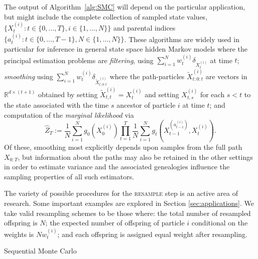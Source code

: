 \documentclass{article} %
\theoremstyle{definition}
\newcommand{\1}[1]{\mathbbm{1}_{\{#1\}}}
\begin{document}
The output of Algorithm~\ref{alg:SMC} will depend on the particular application, but might include the complete collection of sampled state values, $\{X_t^{(i)}: t\in\{0,\ldots,T\}, i \in\{1,\ldots,N\}\}$ and parental indices $\{a_t^{(i)}:t\in\{0,\ldots,T-1\},N\in\{1,\ldots,N\}\}$. These algorithms are widely used in particular for inference in general state space hidden Markov models where the principal estimation problems are \textit{filtering}, using
$\sum_{i=1}^N w_t^{(i)} \delta_{X_t^{(i)}}$ at time $t$; \textit{smoothing} using
  $\sum_{i=1}^N w_t^{(i)} \delta_{\tilde{X}_{t,0:t}^{(i)}}$
  where the path-particles $\tilde{X}_{t:0:t}^{(i)}$ are vectors in $\mathbb{R}^{d\times(t+1)}$ obtained by setting $\tilde{X}_{t,t}^{(i)} = X_{t}^{(i)}$ and setting $X_{t,s}^{(i)}$ for each $s < t$ to the state associated with the time $s$ ancestor of particle $i$ at time $t$;
  and computation of the \emph{marginal likelihood} via $$\hat{Z}_T := \frac{1}{N} \sum_{i=1}^N g_0(X_0^{(i)}) \prod_{t=1}^T \frac{1}{N} \sum_{i=1}^N g_t(X_{t-1}^{(a_{t-1}^{(i)})}, X_t^{(i)}).$$ Of these, smoothing most explicitly depends upon samples from the full path $X_{0:T}$, but information about the paths may also be retained in the other settings in order to estimate variance \cite{lee2018, olsson2019} and the associated genealogies influence the sampling properties of all such estimators.

The variety of possible procedures for the \textsc{resample} step is an active area of research. Some important examples are explored in Section \ref{sec:applications}.
We  take valid resampling schemes to be those where: the total number of resampled offspring is $N$; the expected number of offspring of particle $i$ conditional on the weights is $N w_t^{(i)}$; and each offspring is assigned equal weight after resampling.

\vspace{10pt}
\begin{algorithm}
\DontPrintSemicolon
{}
\caption{Sequential Monte Carlo}\label{alg:SMC}
\end{algorithm}
\vspace{10pt}
\end{document}
